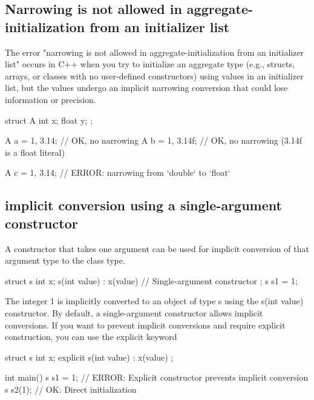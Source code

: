 \documentclass{report}
\begin{document}
    \subsection{Narrowing is not allowed in aggregate-initialization from an initializer list}
    \bigbreak \noindent 
    The error "narrowing is not allowed in aggregate-initialization from an initializer list" occurs in C++ when you try to initialize an aggregate type (e.g., structs, arrays, or classes with no user-defined constructors) using values in an initializer list, but the values undergo an implicit narrowing conversion that could lose information or precision.
    \bigbreak \noindent 
    \begin{cppcode}
        struct A {
            int x;
            float y;
        };

        A a = {1, 3.14}; // OK, no narrowing
        A b = {1, 3.14f}; // OK, no narrowing (3.14f is a float literal)

        A c = {1, 3.14}; // ERROR: narrowing from `double` to `float`
    \end{cppcode}

    \bigbreak \noindent 
    \subsection{implicit conversion using a single-argument constructor}
    \bigbreak \noindent 
     A constructor that takes one argument can be used for implicit conversion of that argument type to the class type.
     \bigbreak \noindent 
     \begin{cppcode}
     struct s {
         int x;
         s(int value) : x(value) {} // Single-argument constructor
     };
     s s1 = 1;
 \end{cppcode}
 \bigbreak \noindent 
 The integer 1 is implicitly converted to an object of type s using the s(int value) constructor.
 \bigbreak \noindent 
 By default, a single-argument constructor allows implicit conversions. If you want to prevent implicit conversions and require explicit construction, you can use the explicit keyword
 \bigbreak \noindent 
 \begin{cppcode}
     struct s {
         int x;
         explicit s(int value) : x(value) {}
     };

     int main() {
         s s1 = 1; // ERROR: Explicit constructor prevents implicit conversion
         s s2(1);  // OK: Direct initialization
     }
 \end{cppcode}
\end{document}
